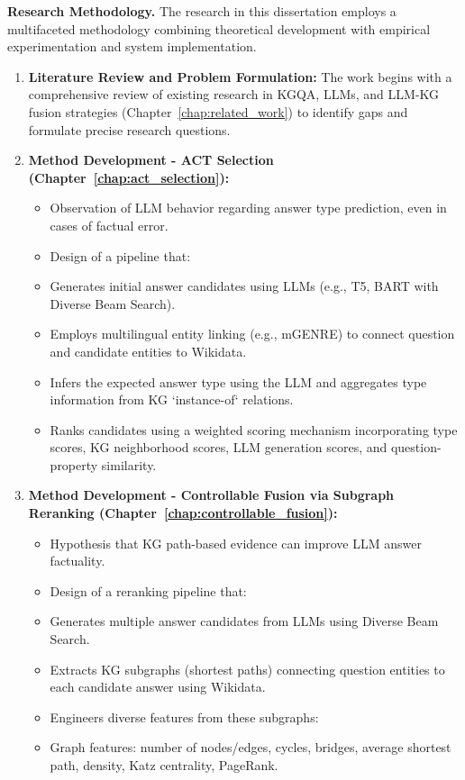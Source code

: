 \textbf{Research Methodology.}
The research in this dissertation employs a multifaceted methodology combining theoretical development with empirical experimentation and system implementation.
\begin{enumerate}
    \item \textbf{Literature Review and Problem Formulation:} The work begins with a comprehensive review of existing research in KGQA, LLMs, and LLM-KG fusion strategies (Chapter~\ref{chap:related_work}) to identify gaps and formulate precise research questions.
    \item \textbf{Method Development - ACT Selection (Chapter~\ref{chap:act_selection}):}
    \begin{itemize}
        \item Observation of LLM behavior regarding answer type prediction, even in cases of factual error.
        \item Design of a pipeline that:
            \item Generates initial answer candidates using LLMs (e.g., T5, BART with Diverse Beam Search).
            \item Employs multilingual entity linking (e.g., mGENRE) to connect question and candidate entities to Wikidata.
            \item Infers the expected answer type using the LLM and aggregates type information from KG `instance-of` relations.
            \item Ranks candidates using a weighted scoring mechanism incorporating type scores, KG neighborhood scores, LLM generation scores, and question-property similarity.
    \end{itemize}
    \item \textbf{Method Development - Controllable Fusion via Subgraph Reranking (Chapter~\ref{chap:controllable_fusion}):}
    \begin{itemize}
        \item Hypothesis that KG path-based evidence can improve LLM answer factuality.
        \item Design of a reranking pipeline that:
            \item Generates multiple answer candidates from LLMs using Diverse Beam Search.
            \item Extracts KG subgraphs (shortest paths) connecting question entities to each candidate answer using Wikidata.
            \item Engineers diverse features from these subgraphs:
                \item Graph features: number of nodes/edges, cycles, bridges, average shortest path, density, Katz centrality, PageRank.

\end{itemize}
\end{enumerate}
